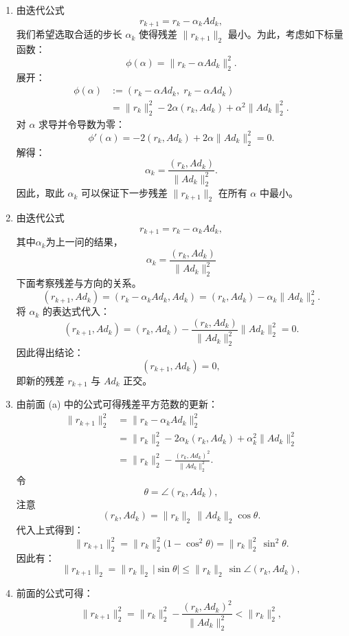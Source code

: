 \documentclass{ctexart}
\begin{document}
\begin{solution}
 \begin{enumerate}
   \item 由迭代公式
\[
r_{k+1} = r_k - \alpha_k A d_k,
\]
我们希望选取合适的步长 $\alpha_k$ 使得残差 $\lVert r_{k+1} \rVert_2$ 最小。为此，考虑如下标量函数：
\[
\phi(\alpha) = \lVert r_k - \alpha A d_k \rVert_2^2.
\]
展开：
\[
\begin{aligned}
\phi(\alpha)&:= (r_k - \alpha A d_k,\; r_k - \alpha A d_k) \\
&= \lVert r_k \rVert_2^2 - 2\alpha (r_k, A d_k) + \alpha^2 \lVert A d_k \rVert_2^2.
\end{aligned}
\]
对 $\alpha$ 求导并令导数为零：
\[
\phi'(\alpha) = -2 (r_k, A d_k) + 2 \alpha \lVert A d_k \rVert_2^2 = 0.
\]
解得：
\[
\alpha_k = \frac{(r_k, A d_k)}{\lVert A d_k \rVert_2^2}.
\]
因此，取此 $\alpha_k$ 可以保证下一步残差 $\lVert r_{k+1} \rVert_2$ 在所有 $\alpha$ 中最小。
\item 
由迭代公式
\[
r_{k+1} = r_k - \alpha_k A d_k,
\]
其中\(\alpha_k \)为上一问的结果，
\[
\alpha_k = \frac{(r_k, A d_k)}{\lVert A d_k \rVert_2^2}
\]
下面考察残差与方向的关系。
\[
(r_{k+1}, A d_k)
= (r_k - \alpha_k A d_k, A d_k)
= (r_k, A d_k) - \alpha_k \lVert A d_k \rVert_2^2.
\]
将 $\alpha_k$ 的表达式代入：
\[
(r_{k+1}, A d_k)
= (r_k, A d_k)
- \frac{(r_k, A d_k)}{\lVert A d_k \rVert_2^2} \lVert A d_k \rVert_2^2
= 0.
\]
因此得出结论：
\[
(r_{k+1}, A d_k) = 0,
\]
即新的残差 $r_{k+1}$ 与 $A d_k$ 正交。
\item 由前面 (a) 中的公式可得残差平方范数的更新：
\[
\begin{aligned}
\lVert r_{k+1} \rVert_2^2 
&= \lVert r_k - \alpha_k A d_k \rVert_2^2 \\
&= \lVert r_k \rVert_2^2 - 2 \alpha_k (r_k, A d_k) + \alpha_k^2 \lVert A d_k \rVert_2^2 \\
&= \lVert r_k \rVert_2^2 - \frac{(r_k, A d_k)^2}{\lVert A d_k \rVert_2^2}.
\end{aligned}
\]
令
\[
\theta = \angle(r_k, A d_k),
\]
注意
\[
(r_k, A d_k) = \lVert r_k \rVert_2 \, \lVert A d_k \rVert_2 \cos \theta.
\]
代入上式得到：
\[
\lVert r_{k+1} \rVert_2^2 = \lVert r_k \rVert_2^2 \bigl( 1 - \cos^2 \theta \bigr) = \lVert r_k \rVert_2^2 \, \sin^2 \theta.
\]
因此有：
\[
\lVert r_{k+1} \rVert_2 = \lVert r_k \rVert_2 \, |\sin \theta| \le \lVert r_k \rVert_2 \, \sin \angle(r_k, A d_k),
\]
\item 前面的公式可得：
\[
\lVert r_{k+1} \rVert_2^2 = \lVert r_k \rVert_2^2 - \frac{(r_k, A d_k)^2}{\lVert A d_k \rVert_2^2} < \lVert r_k \rVert_2^2,
\]
\end{enumerate}
\end{solution}
\end{document}
